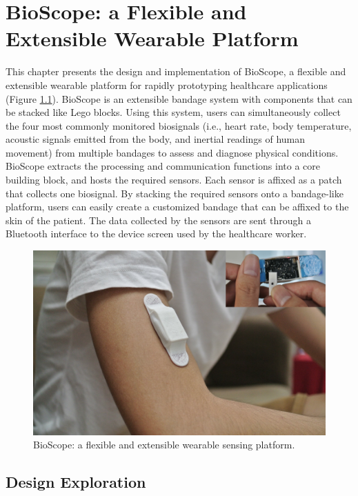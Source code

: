\chapter{BioScope: a Flexible and Extensible Wearable Platform}
This chapter presents the design and implementation of BioScope, a flexible and extensible wearable platform for rapidly prototyping healthcare applications (Figure \ref{bio_fig0}). BioScope is an extensible bandage system with components that can be stacked like Lego blocks. Using this system, users can simultaneously collect the four most commonly monitored biosignals (i.e., heart rate, body temperature, acoustic signals emitted from the body, and inertial readings of human movement) from multiple bandages to assess and diagnose physical conditions. BioScope extracts the processing and communication functions into a core building block, and hosts the required sensors. Each sensor is affixed as a patch that collects one biosignal. By stacking the required sensors onto a bandage-like platform, users can easily create a customized bandage that can be affixed to the skin of the patient. The data collected by the sensors are sent through a Bluetooth interface to the device screen used by the healthcare worker. 

\begin{figure}[!ht]
\centering
\includegraphics[width=14cm]{image/bio_fig0}
\caption{BioScope: a flexible and extensible wearable sensing platform. }
\label{bio_fig0}
\end{figure}


\section{Design Exploration}

